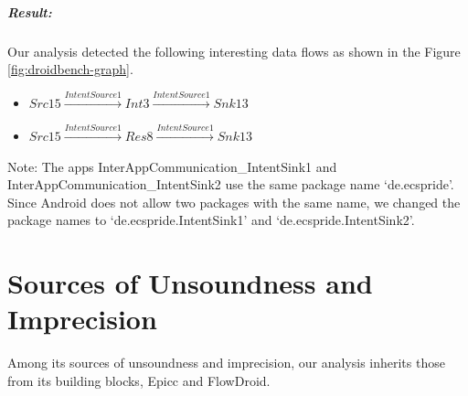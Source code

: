 {\begin{sloppypar}
\begin{itemize}
\paragraph{Result:}
Our analysis detected the following interesting data flows as shown in the Figure \ref{fig:droidbench-graph}.
\begin{flushleft}
\begin{itemize}
\item
$Src15  \xrightarrow{IntentSource1} Int3 \xrightarrow{IntentSource1} Snk13$
\item
$Src15 \xrightarrow{IntentSource1} Res8 \xrightarrow{IntentSource1} Snk13 $
\end{itemize}
\end{flushleft}
\end{itemize}
Note: The apps InterAppCommunication\_IntentSink1 and InterAppCommunication\_IntentSink2 use the same package name `de.ecspride'. Since Android does not allow two packages with the same name, we changed the package names to `de.ecspride.IntentSink1' and `de.ecspride.IntentSink2'.
\end{sloppypar}








\chapter{Sources of Unsoundness and Imprecision}\label{sec:soundness}\label{subsec:sources}
Among its sources of unsoundness and imprecision, our analysis inherits those from its building blocks, Epicc and FlowDroid.
}
